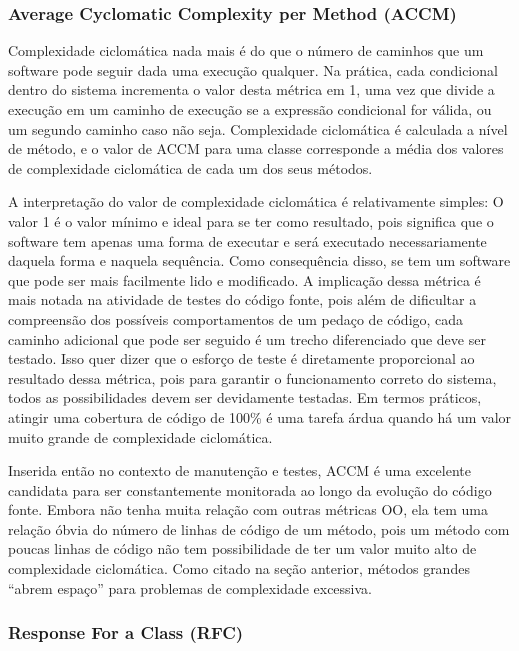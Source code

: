 \subsubsection{Average Cyclomatic Complexity per Method (ACCM)}

Complexidade ciclomática nada mais é do que o número de caminhos que um software pode seguir dada uma execução qualquer. Na prática, cada condicional dentro do sistema incrementa o valor desta métrica em 1, uma vez que divide a execução em um caminho de execução se a expressão condicional for válida, ou um segundo caminho caso não seja. Complexidade ciclomática é calculada a nível de método, e o valor de ACCM para uma classe corresponde a média dos valores de complexidade ciclomática de cada um dos seus métodos.

A interpretação do valor de complexidade ciclomática é relativamente simples: O valor 1 é o valor mínimo e ideal para se ter como resultado, pois significa que o software tem apenas uma forma de executar e será executado necessariamente daquela forma e naquela sequência. Como consequência disso, se tem um software que pode ser mais facilmente lido e modificado. A implicação dessa métrica é mais notada na atividade de testes do código fonte, pois além de dificultar a compreensão dos possíveis comportamentos de um pedaço de código, cada caminho adicional que pode ser seguido é um trecho diferenciado que deve ser testado. Isso quer dizer que o esforço de teste é diretamente proporcional ao resultado dessa métrica, pois para garantir o funcionamento correto do sistema, todos as possibilidades devem ser devidamente testadas. Em termos práticos, atingir uma cobertura de código de 100\% é uma tarefa árdua quando há um valor muito grande de complexidade ciclomática.

Inserida então no contexto de manutenção e testes, ACCM é uma excelente candidata para ser constantemente monitorada ao longo da evolução do código fonte. Embora não tenha muita relação com outras métricas OO, ela tem uma relação óbvia do número de linhas de código de um método, pois um método com poucas linhas de código não tem possibilidade de ter um valor muito alto de complexidade ciclomática. Como citado na seção anterior, métodos grandes ``abrem espaço'' para problemas de complexidade excessiva.

\subsubsection{Response For a Class (RFC)}

